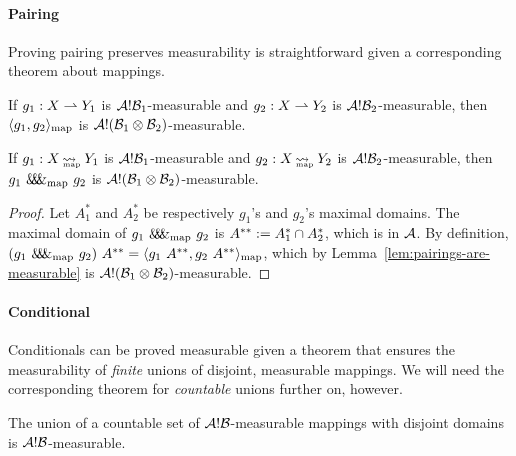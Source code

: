 \paragraph{Pairing}
Proving pairing preserves measurability is straightforward given a corresponding theorem about mappings.

\begin{lemma}
\label{lem:pairings-are-measurable}
If $g_1 : X \rightharpoonup Y_1$ is $\mathcal{A}!\mathcal{B}_1$-measurable and $g_2 : X \rightharpoonup Y_2$ is $\mathcal{A}!\mathcal{B}_2$-measurable, then $\langle{g_1,g_2}\rangle_\mathrm{map}$ is $\mathcal{A}!(\mathcal{B}_1 \otimes \mathcal{B}_2)$-measurable.%
\end{lemma}

\begin{theorem}
If $g_1 : X \operatorname{\rightsquigarrow_{\mspace{-21mu}_\mathrm{map}}} Y_1$ is $\mathcal{A}!\mathcal{B}_1$-measurable and $g_2 : X \operatorname{\rightsquigarrow_{\mspace{-21mu}_\mathrm{map}}} Y_2$ is $\mathcal{A}!\mathcal{B}_2$-measurable, then $g_1~\mathit{\&\mspace{-7.5mu}\&\mspace{-7.5mu}\&}_\mathrm{map}~g_2$ is $\mathcal{A}!(\mathcal{B}_1 \otimes \mathcal{B}_2)$-measurable.
\end{theorem}
\begin{proof}
Let $A_1^*$ and $A_2^*$ be respectively $g_1$'s and $g_2$'s maximal domains.
The maximal domain of $g_1~\mathit{\&\mspace{-7.5mu}\&\mspace{-7.5mu}\&}_\mathrm{map}~g_2$ is $A^{**} := A_1^* \cap A_2^*$, which is in $\mathcal{A}$.
By definition, $(g_1~\mathit{\&\mspace{-7.5mu}\&\mspace{-7.5mu}\&}_\mathrm{map}~g_2)~A^{**} = \langle{g_1~A^{**},g_2~A^{**}}\rangle_\mathrm{map}$, which by Lemma~\ref{lem:pairings-are-measurable} is $\mathcal{A}!(\mathcal{B}_1 \otimes \mathcal{B}_2)$-measurable.
\end{proof}

\paragraph{Conditional}
Conditionals can be proved measurable given a theorem that ensures the measurability of \emph{finite} unions of disjoint, measurable mappings.
We will need the corresponding theorem for \emph{countable} unions further on, however.

\begin{lemma}
\label{lem:union-of-measurable-mappings}
The union of a countable set of $\mathcal{A}!\mathcal{B}$-measurable mappings with disjoint domains is $\mathcal{A}!\mathcal{B}$-measurable.%
\end{lemma}

